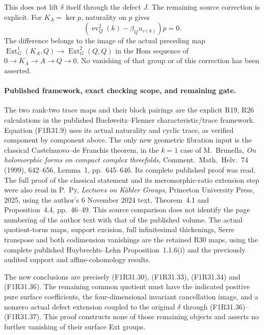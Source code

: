 This does not lift $\delta$ itself
through the defect $J$. The remaining
source correction is explicit. For
$K_A=\ker p$, naturality on $p$ gives
\[
       (\operatorname{ev}_Q^2(k)
                   -\beta_Q u_{v(k)})p=0.
 \tag{F1R31.37}
\]
The difference belongs to the image
of the actual preceding map
$\operatorname{Ext}^1_G(K_A,Q)
\to\operatorname{Ext}^2_G(Q,Q)$
in the Hom sequence of
$0\to K_A\to A\to Q\to0$.
No vanishing of that group or
of this correction has been asserted.

\paragraph{Published framework, exact checking scope, and remaining gate.}
The two rank-two trace maps and their
block pairings are the explicit R19,
R26 calculations in the published
Buchweitz--Flenner characteristic/trace
framework. Equation (F1R31.9) uses
its actual naturality and cyclic trace,
as verified component by component above.
The only new geometric fibration input
is the classical Castelnuovo--de Franchis
theorem, in the $k=1$ case of
M.~Brunella, \emph{On holomorphic forms
on compact complex threefolds},
Comment.~Math.~Helv.~74 (1999), 642--656,
Lemma~1, pp.~645--646. Its complete
published proof was read. The full
proof of the classical statement and
its meromorphic-ratio extension step
were also read in P.~Py,
\emph{Lectures on K\"ahler Groups},
Princeton University Press, 2025,
using the author's 6 November 2024
text, Theorem~4.1 and Proposition~4.4,
pp.~46--49. This source comparison
does not identify the page numbering
of the author text with that of the
published volume.
The actual quotient-torus maps,
support excision, full infinitesimal
thickenings, Serre transpose and both
codimension vanishings are the retained
R30 maps, using the complete published
Huybrechts--Lehn Proposition~1.1.6(i)
and the previously audited support
and affine-cohomology results.

The new conclusions are precisely
(F1R31.30), (F1R31.33), (F1R31.34)
and (F1R31.36). The remaining common
quotient must have the indicated
positive pure surface coefficients,
the four-dimensional invariant
cancellation image, and a nonzero
actual defect extension coupled to
the original $\delta$ through
(F1R31.36)--(F1R31.37). This proof
constructs none of those remaining
objects and asserts no further
vanishing of their surface Ext groups.
